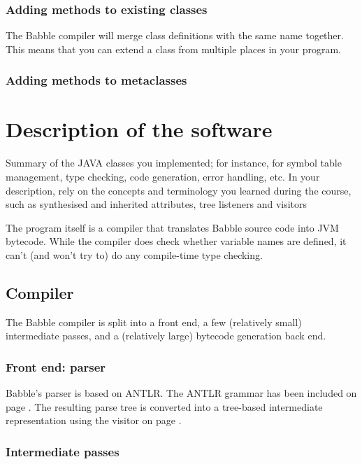 \documentclass[a4paper]{article}
\begin{document}
\label{merge}
\subsubsection{Adding methods to existing classes}

The Babble compiler will merge class definitions with the same name together.
This means that you can extend a class from multiple places in your program.

\subsubsection{Adding methods to metaclasses}

\section{Description of the software}
Summary of the JAVA classes you implemented; for instance, for symbol
table management, type checking, code generation, error handling, etc. In your description, rely
on the concepts and terminology you learned during the course, such as synthesised and inherited
attributes, tree listeners and visitors

The program itself is a compiler that translates Babble source code into JVM bytecode.
While the compiler does check whether variable names are defined, it can't (and won't try to) do any compile-time type checking.

\subsection{Compiler}

The Babble compiler is split into a front end, a few (relatively small) intermediate passes, and a (relatively large) bytecode generation back end.

\subsubsection{Front end: parser}

Babble's parser is based on ANTLR.
The ANTLR grammar has been included on page \pageref{grammar}.
The resulting parse tree is converted into a tree-based intermediate representation using the visitor on page \pageref{visitor}.

\subsubsection{Intermediate passes}
\end{document}

